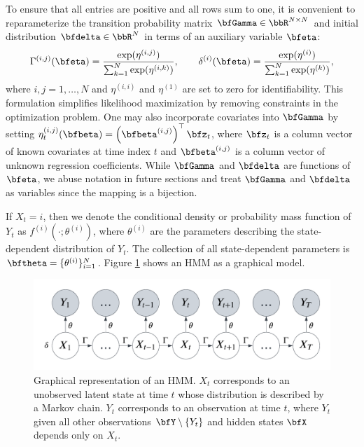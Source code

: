 To ensure that all entries are positive and all rows sum to one, it is convenient to reparameterize the transition probability matrix $\bfGamma \in \bbR^{N \times N}$ and initial distribution $\bfdelta \in \bbR^N$ in terms of an auxiliary variable $\bfeta$: %
%
\begin{equation}
    \Gamma^{(i,j)}(\bfeta) = \frac{\exp(\eta^{(i,j)})}{\sum_{k=1}^N \exp(\eta^{(i,k)})}, \qquad \delta^{(i)}(\bfeta) = \frac{\exp(\eta^{(i)})}{\sum_{k=1}^N \exp(\eta^{(k)})},
    \label{eqn:reparam}
\end{equation}
%
where $i,j = 1,\ldots,N$ and $\eta^{(i,i)}$ and $\eta^{(1)}$ are set to zero for identifiability. This formulation simplifies likelihood maximization by removing constraints in the optimization problem. One may also incorporate covariates into $\bfGamma$ by setting $\eta_t^{(i,j)}(\bfbeta) = \left(\bfbeta^{(i,j)}\right)^{\top} \bfz_t$, where $\bfz_t$ is a column vector of known covariates at time index $t$ and $\bfbeta^{(i,j)}$ is a column vector of unknown regression coefficients. While $\bfGamma$ and $\bfdelta$ are functions of $\bfeta$, we abuse notation in future sections and treat $\bfGamma$ and $\bfdelta$ as variables since the mapping is a bijection.

If $X_t=i$, then we denote the conditional density or probability mass function of $Y_t$ as $f^{(i)}(\cdot ; \theta^{(i)})$, where $\theta^{(i)}$ are the parameters describing the state-dependent distribution of $Y_t$. The collection of all state-dependent parameters is $\bftheta = \{\theta^{(i)}\}_{i=1}^N$. Figure \ref{fig:HMM} shows an HMM as a graphical model.

\begin{figure}[h]
    \centering
    \includegraphics[width=5in]{../plt/HMM.png}
    \caption{Graphical representation of an HMM. $X_t$ corresponds to an unobserved latent state at time $t$ whose distribution is described by a Markov chain. $Y_t$ corresponds to an observation at time $t$, where $Y_t$ given all other observations $\bfY \setminus \{Y_t\}$ and hidden states $\bfX$ depends only on $X_t$.}
    \label{fig:HMM}
\end{figure}

